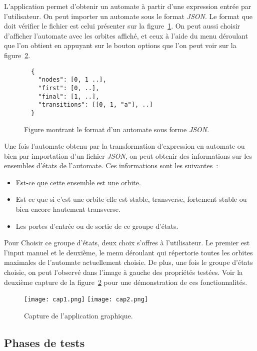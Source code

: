 L'application permet d'obtenir un automate à partir d'une expression entrée 
par l'utilisateur. On peut importer un automate sous le format \textit{JSON}. Le 
format que doit vérifier le fichier est celui présenter sur la 
figure~\ref{fig:jsonFormat}. On peut aussi choisir d'afficher l'automate avec 
les orbites affiché, et ceux à l'aide du menu déroulant que l'on obtient en 
appuyant sur le bouton options que l'on peut voir sur la 
figure~\ref{fig:cap1}.

\begin{figure}[H]
  \begin{verbatim}
  {
    "nodes": [0, 1 ..],
    "first": [0, ..],
    "final": [1, ..],
    "transitions": [[0, 1, "a"], ..] 
  }
  \end{verbatim}
  \caption{Figure montrant le format d'un automate sous forme \textit{JSON}.}
  \label{fig:jsonFormat}
\end{figure}

Une fois l'automate obtenu par la transformation d'expression en automate ou 
bien par importation d'un fichier \textit{JSON}, on peut obtenir des 
informations sur les ensembles d'états de l'automate. Ces informations sont les 
suivantes~:

\begin{itemize}
  \item[\textbullet] Est-ce que cette ensemble est une orbite.
  \item[\textbullet] Est ce que si c'est une orbite elle est stable, transverse,
  fortement stable ou bien encore hautement transverse.
  \item[\textbullet] Les portes d'entrée ou de sortie de ce groupe d'états.
\end{itemize}

Pour Choisir ce groupe d'états, deux choix s'offres à l'utilisateur. Le premier
est l'input manuel et le deuxième, le menu déroulant qui répertorie toutes les 
orbites maximales de l'automate actuellement choisie. De plus, une fois le 
groupe d'états choisie, on peut l'observé dans l'image à gauche des propriétés 
testées. Voir la deuxième capture de la figure~\ref{fig:cap1} pour une 
démonstration de ces fonctionnalités.

\begin{figure}[H]
  \texttt{[image: cap1.png]}
  \texttt{[image: cap2.png]}
  \caption{Capture de l'application graphique.}\label{fig:cap1}
\end{figure}

\subsection{Phases de tests}

